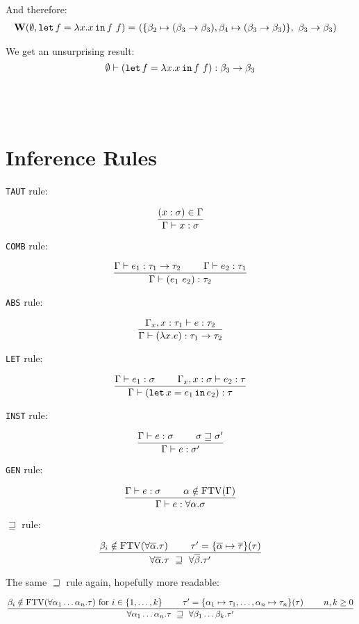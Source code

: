 \documentclass[a4paper,oneside]{memoir}
\begin{document}
And therefore:
\begin{align*}
\operatorname{\textbf{W}}(\emptyset, \texttt{let} \, f = \lambda x . x \, \texttt{in} \, f~f) = ~ & (\{ \beta_2 \mapsto (\beta_3 \rightarrow \beta_3), \beta_4 \mapsto (\beta_3 \rightarrow \beta_3) \},~ \beta_3 \rightarrow \beta_3)
\end{align*}

We get an unsurprising result:
$$\emptyset \vdash (\texttt{let} \, f = \lambda x . x \, \texttt{in} \, f~f) : \beta_3 \rightarrow \beta_3$$
~

~



\section{Inference Rules}

\texttt{TAUT} rule:

$$\dfrac{(x : \sigma) \in \Gamma}{ \Gamma \vdash x : \sigma}$$

\texttt{COMB} rule:

$$\dfrac{\Gamma \vdash e_1 : \tau_1 \rightarrow \tau_2 ~ ~ ~ ~ ~ ~ ~ \Gamma \vdash e_2 : \tau_1}{\Gamma \vdash (e_1~e_2) : \tau_2}$$

\texttt{ABS} rule:

$$\dfrac{\Gamma_x,x:\tau_1 \vdash e : \tau_2}{\Gamma \vdash (\lambda x . e) :  \tau_1 \rightarrow \tau_2}$$

\texttt{LET} rule:

$$\dfrac{\Gamma \vdash e_1 : \sigma ~ ~ ~ ~ ~ ~ ~ \Gamma_x,x:\sigma \vdash e_2 : \tau}{\Gamma \vdash (\texttt{let} \, x = e_1 \, \texttt{in} \, e_2) :  \tau}$$

\texttt{INST} rule:

$$\dfrac{\Gamma \vdash e : \sigma ~ ~ ~ ~ ~ ~ ~ \sigma \sqsupseteq \sigma^\prime}{\Gamma \vdash e : \sigma^\prime}$$

\texttt{GEN} rule:

$$\dfrac{\Gamma \vdash e : \sigma ~ ~ ~ ~ ~ ~ ~ \alpha \notin \operatorname{FTV}(\Gamma)}{\Gamma \vdash e : \forall \alpha . \sigma}$$

$\sqsupseteq$ rule:

$$\dfrac{\beta_i \notin \operatorname{FTV}(\forall \overline{\alpha}.\tau) ~ ~ ~ ~ ~ ~ ~ \tau^\prime = \{\overline{\alpha} \mapsto \overline{\tau}\}(\tau)}{\forall \overline{\alpha}.\tau  ~ \sqsupseteq ~   \forall \overline{\beta}.\tau^\prime}$$

The same $\sqsupseteq$ rule again, hopefully more readable:

$$\dfrac{\beta_i \notin \operatorname{FTV}(\forall \alpha_1\dots\alpha_n.\tau) \text{ for } i \in \{1,\dots,k\} ~ ~ ~ ~ ~ ~ ~ \tau^\prime = \{ \alpha_1 \mapsto \tau_1,  \dots, \alpha_n \mapsto \tau_n \}(\tau) ~ ~ ~ ~ ~ ~ ~ n,k \geq 0}{\forall \alpha_1\dots\alpha_n.\tau  ~ \sqsupseteq ~   \forall \beta_1\dots\beta_k.\tau^\prime}$$
\end{document}
